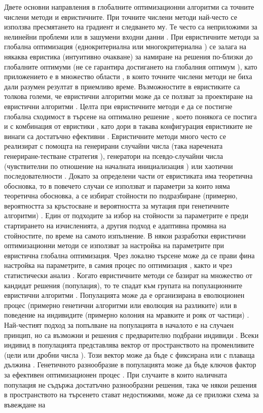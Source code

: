 Двете основни направления в глобалните оптимизационни алгоритми са точните числени методи и евристичните. При точните числени методи най-често се използва пресмятането на градиент и следването му. Те често са неприложими за нелинейни проблеми \cite{Koziel-01} или в зашумени входни данни \cite{Beyer-02}. При евристичните методи за глобална оптимизация (еднокритериална или многокритериална \cite{Cheng-01}) се залага на някаква евристика (интуитивно очакване) за намиране на решения по-близки до глобалните оптимуми (не се гарантира достигането на глобалния оптимум \cite{Coello-02}), като приложението е в множество области \cite{Slowik-02}, в които точните числени методи не биха дали разумен резултат в приемливо време. Възможностите в евристиките са толкова големи, че евристични алгоритми може да се ползват за проектиране на евристични алгоритми \cite{Diosan-01}. Целта при евристичните методи е да се постигне глобална сходимост \cite{He-02} в търсене на оптимално решение \cite{Beyer-01}, което понякога се постига и с комбинация от евристики \cite{Grosan-01}, като дори в такава конфигурация евристиките не винаги са достатъчно ефективни \cite{He-01}. Евристичните методи много често се реализират с помощта на генерирани случайни числа (така наречената генериране-тестване стратегия \cite{Yao-02}), генератори на псевдо-случайни числа \cite{Kazimipour-01} (чувствителни по отношение на началната инициализация \cite{Eiben-02}) или хаотични последователности \cite{Caponetto-01}. Докато за определени части от евристиката има теоретична обосновка, то в повечето случаи се използват и параметри за които няма теоретична обосновка, а се избират стойности по подразбиране (примерно, вероятността за кръстосване и вероятността за мутация при генетичните алгоритми) \cite{Eiben-01}. Един от подходите за избор на стойности за параметрите е преди стартирането на изчисленията, а другия подход е адаптивна промяна на стойностите, по време на самото изпълнение. В някои разработки евристични оптимизационни методи се използват за настройка на параметрите при евристична глобална оптимизация. Чрез локално търсене може да се прави фина настройка на параметрите, в самия процес по оптимизация \cite{Karafotias-01}, както и чрез статистически анализ \cite{Francois-01}. Когато евристичните методи се базират на множество от кандидат решения (популация), то те спадат към групата на популационните евристични алгоритми \cite{Whitley-01}. Популацията може да е организирана в еволюционен процес (примерно генетични алгоритми или еволюция на разликите) или в поведение на индивидите (примерно колония на мравките и рояк от частици) \cite{El-Abd-01}. Най-честият подход за попълване на популацията в началото е на случаен принцип, но са възможни и решения с предварително подбрани индивиди \cite{Coello-01}. Всеки индивид в популацията представлява вектор от пространството на променливите (цели или дробни числа \cite{Kachitvichyanukul-01}). Този вектор може да бъде с фиксирана или с плаваща дължина \cite{Ryerkerk-01}. Генетичното разнообразие в популацията може да бъде ключов фактор за ефективен оптимизационен процес \cite{Ursem-01}. При случаите в които наличната популация не съдържа достатъчно разнообразни решения, така че някои решения в пространството на търсенето стават недостижими, може да се приложи схема за въвеждане на 